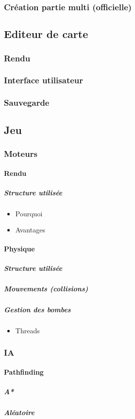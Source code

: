 \documentclass[]{report}
\begin{document}
			\subsubsection{Création partie multi (officielle)}
			
		\subsection{Editeur de carte}
			\subsubsection{Rendu}
			\subsubsection{Interface utilisateur}
			\subsubsection{Sauvegarde}
		\subsection{Jeu}
			\subsubsection{Moteurs}
				\paragraph{Rendu}
					\subparagraph{Structure utilisée}
					\begin{itemize}
						\item{Pourquoi}
						\item{Avantages}
					\end{itemize}
				\paragraph{Physique}
					\subparagraph{Structure utilisée}
					\subparagraph{Mouvements (collisions)}
					\subparagraph{Gestion des bombes}
						\begin{itemize}
							\item{Threads}
						\end{itemize}
			\subsubsection{IA}
				\paragraph{Pathfinding}
					\subparagraph{A*}
					\subparagraph{Aléatoire}
\end{document}
